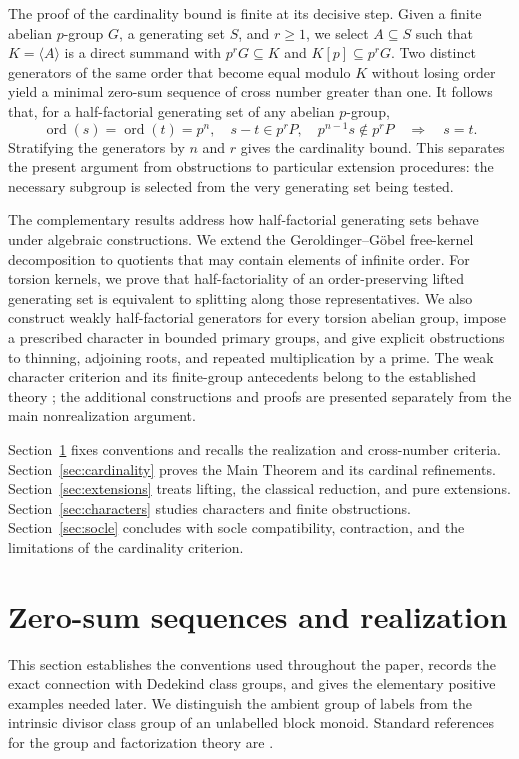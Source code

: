 \documentclass[11pt,reqno]{amsart}
\numberwithin{equation}{section}
\theoremstyle{definition}
\theoremstyle{remark}
\DeclareMathOperator{\ord}{ord}
\begin{document}
The proof of the cardinality bound is finite at its decisive step.
Given a finite abelian $p$-group $G$, a generating set $S$, and
$r\ge1$, we select $A\subseteq S$ such that $K=\langle A\rangle$
is a direct summand with $p^rG\subseteq K$ and
$K[p]\subseteq p^rG$. Two distinct generators of the same order
that become equal modulo $K$ without losing order yield a minimal
zero-sum sequence of cross number greater than one. It follows that,
for a half-factorial generating set of any abelian $p$-group,
\[
 \ord(s)=\ord(t)=p^n,\quad s-t\in p^rP,\quad
 p^{n-1}s\notin p^rP \quad\Longrightarrow\quad s=t.
\]
Stratifying the generators by $n$ and $r$ gives the cardinality
bound. This separates the present argument from obstructions to
particular extension procedures: the necessary subgroup is selected
from the very generating set being tested.

The complementary results address how half-factorial generating
sets behave under algebraic constructions. We extend the
Geroldinger--G\"obel free-kernel decomposition to quotients that may
contain elements of infinite order. For torsion kernels, we prove
that half-factoriality of an order-preserving lifted generating
set is equivalent to splitting along those representatives. We
also construct weakly half-factorial generators for every torsion
abelian group, impose a prescribed character in bounded primary
groups, and give explicit obstructions to thinning, adjoining
roots, and repeated multiplication by a prime. The weak character
criterion and its finite-group antecedents belong to the established
theory \cite{GaoGeroldinger,RadziejewskiSchmid,Schmid2005}; the
additional constructions and proofs are presented separately from
the main nonrealization argument.

Section~\ref{sec:preliminaries} fixes conventions and recalls the
realization and cross-number criteria. Section~\ref{sec:cardinality}
proves the Main Theorem and its cardinal refinements.
Section~\ref{sec:extensions} treats lifting, the classical reduction,
and pure extensions. Section~\ref{sec:characters} studies characters
and finite obstructions. Section~\ref{sec:socle} concludes with
socle compatibility, contraction, and the limitations of the
cardinality criterion.

\section{Zero-sum sequences and realization}\label{sec:preliminaries}

This section establishes the conventions used throughout the paper,
records the exact connection with Dedekind class groups, and gives
the elementary positive examples needed later. We distinguish the
ambient group of labels from the intrinsic divisor class group of
an unlabelled block monoid. Standard references for the group and
factorization theory are \cite{Fuchs,FuchsII,GHK}.
\end{document}
